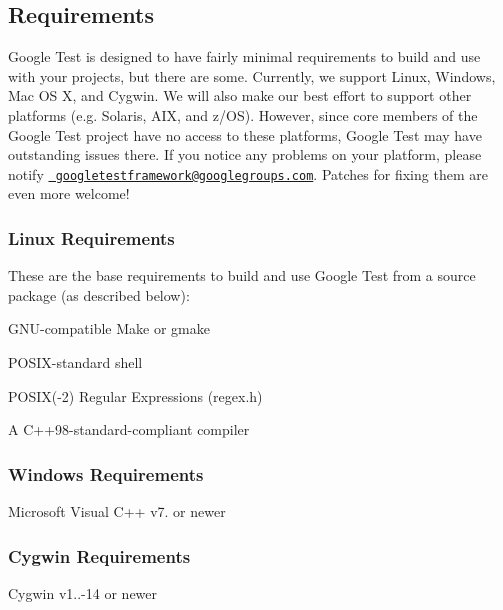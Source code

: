 \subsection*{Requirements}

Google Test is designed to have fairly minimal requirements to build and use with your projects, but there are some. Currently, we support Linux, Windows, Mac OS X, and Cygwin. We will also make our best effort to support other platforms (e.\+g. Solaris, A\+IX, and z/\+OS). However, since core members of the Google Test project have no access to these platforms, Google Test may have outstanding issues there. If you notice any problems on your platform, please notify \href{mailto:googletestframework@googlegroups.com}\texttt{ googletestframework@googlegroups.\+com}. Patches for fixing them are even more welcome!

\subsubsection*{Linux Requirements}

These are the base requirements to build and use Google Test from a source package (as described below)\+:


\begin{DoxyItemize}
\item G\+N\+U-\/compatible Make or gmake
\item P\+O\+S\+I\+X-\/standard shell
\item P\+O\+S\+IX(-\/2) Regular Expressions (regex.\+h)
\item A C++98-\/standard-\/compliant compiler
\end{DoxyItemize}

\subsubsection*{Windows Requirements}


\begin{DoxyItemize}
\item Microsoft Visual C++ v7. or newer
\end{DoxyItemize}

\subsubsection*{Cygwin Requirements}


\begin{DoxyItemize}
\item Cygwin v1..-\/14 or newer
\end{DoxyItemize}

